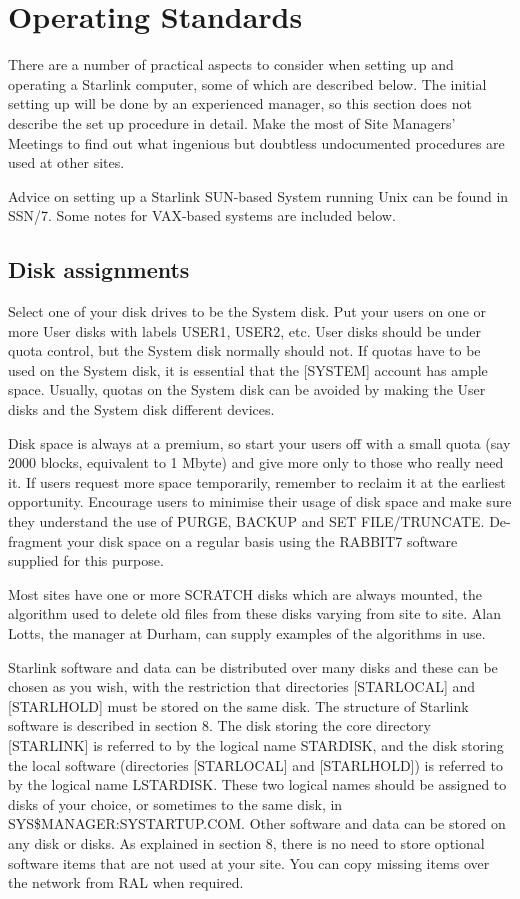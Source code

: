 \section {Operating Standards}

There are a number of practical aspects to consider when setting up and
operating a Starlink computer, some of which are described below.
The initial setting up will be done by an experienced manager, so this
section does not describe the set up procedure in detail.
Make the most of Site Managers' Meetings to find out what ingenious but
doubtless undocumented procedures are used at other sites.

Advice on setting up a Starlink SUN-based System running Unix can be found in
SSN/7.
Some notes for VAX-based systems are included below.

\subsection {Disk assignments}

Select one of your disk drives to be the System disk.
Put your users on one or more User disks with labels USER1, USER2, etc.
User disks should be under quota control, but the System disk normally should
not.
If quotas have to be used on the System disk, it is essential that the [SYSTEM]
account has ample space.
Usually, quotas on the System disk can be avoided by making the User disks and
the System disk different devices.
 
Disk space is always at a premium, so start your users off with a small quota
(say 2000 blocks, equivalent to 1 Mbyte) and give more only to those who really
need it.
If users request more space temporarily, remember to reclaim it at the
earliest opportunity.
Encourage users to minimise their usage of disk space and make sure they
understand the use of PURGE, BACKUP and SET FILE/TRUNCATE.
De-fragment your disk space on a regular basis using the RABBIT7 software
supplied for this purpose.

Most sites have one or more SCRATCH disks which are always mounted, the
algorithm used to delete old files from these disks varying from site to site.
Alan Lotts, the manager at Durham, can supply examples of the algorithms in use.

Starlink software and data can be distributed over many disks and these can be
chosen as you wish, with the restriction that directories [STARLOCAL] and
[STARLHOLD] must be stored on the same disk.
The structure of Starlink software is described in section 8.
The disk storing the core directory [STARLINK] is referred to
by the logical name STARDISK, and the disk storing the local software
(directories [STARLOCAL] and [STARLHOLD]) is referred to by the logical name
LSTARDISK.
These two logical names should be assigned to disks of your choice,
or sometimes to the same disk, in SYS\$MANAGER:SYSTARTUP.COM.
Other software and data can be stored on any disk or disks.
As explained in section 8, there is no need to store optional software items
that are not used at your site.
You can copy missing items over the network from RAL when required.
 
